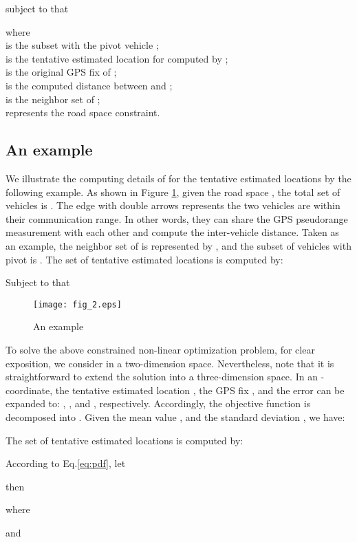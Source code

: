 \documentclass[letterpaper, 10 pt, conference]{ieeeconf}
\begin{document}
subject to that

where\\
 is the subset with the pivot vehicle ;\\
 is the tentative estimated location for  computed by ;\\
 is the original GPS fix of ;\\
 is the computed distance between  and ;\\
 is the neighbor set of ;\\
 represents the road space constraint.

\subsection{An example}
We illustrate the computing details of for the tentative estimated locations  by the following example. As shown in Figure \ref{fig:2}, given the road space , the total set of vehicles is . The edge with double arrows  represents the two vehicles are within their communication range. In other words, they can share the GPS pseudorange measurement with each other and compute the inter-vehicle distance. Taken    as an example, the neighbor set of  is represented by , and the subset of vehicles with pivot   is  . The set of tentative estimated locations  is computed by:
\setlength{\abovedisplayskip}{2mm}
\setlength{\belowdisplayskip}{2mm}

Subject to that



\begin{figure}
\centering
\texttt{[image: fig\_2.eps]}
\caption{An example}
\label{fig:2}
\end{figure}

To solve the above constrained non-linear optimization problem, for clear exposition, we consider in a two-dimension space. Nevertheless, note that it is straightforward to extend the solution into a three-dimension space. In an - coordinate, the tentative estimated location , the GPS fix , and the error  can be expanded to: , , and , respectively. Accordingly, the objective function is decomposed into . Given the mean value , and the standard deviation , we have:


\noindent The set of tentative estimated locations is computed by:

According to Eq.\ref{eq:pdf}, let

then

\noindent where

\noindent and
\end{document}
